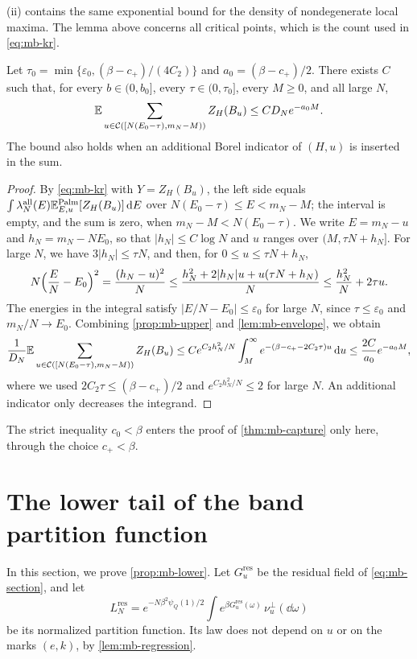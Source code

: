 (ii) contains the same exponential bound for the density of nondegenerate local maxima. The lemma above concerns all critical points, which is the count used in \eqref{eq:mb-kr}.

\begin{corollary}\label{cor:mb-low-sum}
Let $\tau_0=\min\{\varepsilon_0,(\beta-c_+)/(4C_2)\}$ and $a_0=(\beta-c_+)/2$. There exists $C$ such that, for every $b\in(0,b_0]$, every $\tau\in(0,\tau_0]$, every $M\ge0$, and all large $N$,
\begin{equation}\label{eq:mb-low-sum}
\mathbb E\sum_{u\in\mathcal C([N(E_0-\tau),m_N-M))}Z_H(B_u)\le CD_Ne^{-a_0M}.
\end{equation}
The bound also holds when an additional Borel indicator of $(H,u)$ is inserted in the sum.
\end{corollary}

\begin{proof}
By \eqref{eq:mb-kr} with $Y=Z_H(B_u)$, the left side equals $\int\lambda^{\mathrm{all}}_N(E)\mathbb E^{\mathrm{Palm}}_{E,u}[Z_H(B_u)]\,\mathrm d E$ over $N(E_0-\tau)\le E<m_N-M$; the interval is empty, and the sum is zero, when $m_N-M<N(E_0-\tau)$. We write $E=m_N-u$ and $h_N=m_N-NE_0$, so that $|h_N|\le C\log N$ and $u$ ranges over $(M,\tau N+h_N]$. For large $N$, we have $3|h_N|\le\tau N$, and then, for $0\le u\le\tau N+h_N$,
\[
N\Bigl(\frac EN-E_0\Bigr)^2=\frac{(h_N-u)^2}N\le\frac{h_N^2+2|h_N|u+u(\tau N+h_N)}N\le\frac{h_N^2}N+2\tau u .
\]
The energies in the integral satisfy $|E/N-E_0|\le\varepsilon_0$ for large $N$, since $\tau\le\varepsilon_0$ and $m_N/N\to E_0$. Combining \cref{prop:mb-upper} and \cref{lem:mb-envelope}, we obtain
\[
\frac1{D_N}\mathbb E\sum_{u\in\mathcal C([N(E_0-\tau),m_N-M))}Z_H(B_u)\le Ce^{C_2h_N^2/N}\int_M^\infty e^{-(\beta-c_+-2C_2\tau)u}\,\mathrm d u\le\frac{2C}{a_0}e^{-a_0M},
\]
where we used $2C_2\tau\le(\beta-c_+)/2$ and $e^{C_2h_N^2/N}\le2$ for large $N$. An additional indicator only decreases the integrand.
\end{proof}

The strict inequality $c_0<\beta$ enters the proof of \cref{thm:mb-capture} only here, through the choice $c_+<\beta$.

\section{The lower tail of the band partition function}\label{sec:mb-lower}

In this section, we prove \cref{prop:mb-lower}. Let $G^{\mathrm{res}}_u$ be the residual field of \eqref{eq:mb-section}, and let
\begin{equation}\label{eq:mb-Lres}
L_N^{\mathrm{res}}=e^{-N\beta^2\psi_Q(1)/2}\int e^{\beta G^{\mathrm{res}}_u(\omega)}\,\nu_u^\perp(\dd\omega)
\end{equation}
be its normalized partition function. Its law does not depend on $u$ or on the marks $(e,k)$, by \cref{lem:mb-regression}.


